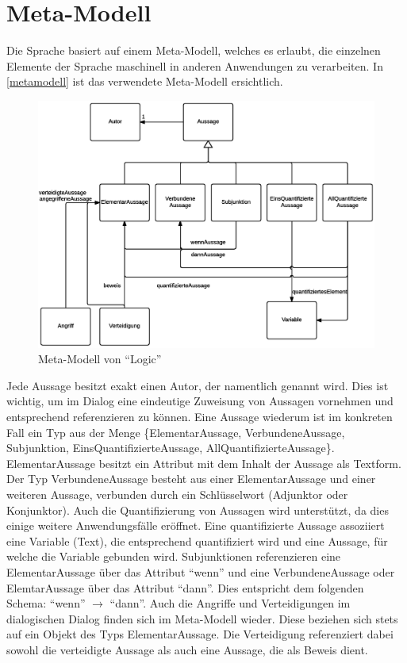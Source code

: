 \documentclass[11pt,a4paper,bibtotocnumbered]{scrreprt}
\begin{document}
\section{Meta-Modell}

Die Sprache basiert auf einem Meta-Modell, welches es erlaubt, die einzelnen Elemente der Sprache maschinell in anderen Anwendungen zu verarbeiten.
In \autoref{metamodell} ist das verwendete Meta-Modell ersichtlich.

\begin{figure}[htbp]
\centering
\includegraphics[width=1\textwidth]{img/metamodell.png}
\caption{Meta-Modell von \enquote{Logic}}
\label{metamodell}
\end{figure}

Jede Aussage besitzt exakt einen Autor, der namentlich genannt wird.
Dies ist wichtig, um im Dialog eine eindeutige Zuweisung von Aussagen vornehmen und entsprechend referenzieren zu können.
Eine Aussage wiederum ist im konkreten Fall ein Typ aus der Menge \{ElementarAussage, VerbundeneAussage, Subjunktion, EinsQuantifizierteAussage, AllQuantifizierteAussage\}. 
ElementarAussage besitzt ein Attribut mit dem Inhalt der Aussage als Textform.
Der Typ VerbundeneAussage besteht aus einer ElementarAussage und einer weiteren Aussage, verbunden durch ein Schlüsselwort (Adjunktor oder Konjunktor).
Auch die Quantifizierung von Aussagen wird unterstützt, da dies einige weitere Anwendungsfälle eröffnet.
Eine quantifizierte Aussage assoziiert eine Variable (Text), die entsprechend quantifiziert wird und eine Aussage, für welche die Variable gebunden wird.
Subjunktionen referenzieren eine ElementarAussage über das Attribut \enquote{wenn} und eine VerbundeneAussage oder ElemtarAussage über das Attribut \enquote{dann}.
Dies entspricht dem folgenden Schema: \enquote{wenn} $\rightarrow$ \enquote{dann}.
Auch die Angriffe und Verteidigungen im dialogischen Dialog finden sich im Meta-Modell wieder. 
Diese beziehen sich stets auf ein Objekt des Typs ElementarAussage.
Die Verteidigung referenziert dabei sowohl die verteidigte Aussage als auch eine Aussage, die als Beweis dient.
\end{document}
